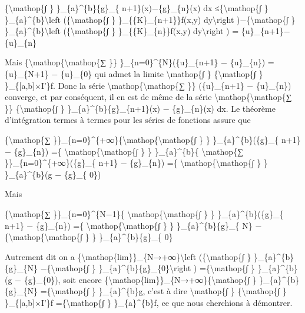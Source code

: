 \documentclass[]{article}
\begin{document}
\{\textbackslash{}mathop\{∫ \} \}\_\{a\}\^{}\{b\}\textbar{}\{g\}\_\{
n+1\}(x)−\{g\}\_\{n\}(x)\textbar{} dx ≤\{\textbackslash{}mathop\{∫ \}
\}\_\{a\}\^{}\{b\}\textbackslash{}left (\{\textbackslash{}mathop\{∫ \}
\}\_\{\{K\}\_\{n+1\}\}\textbar{}f(x,y)\textbar{} dy\textbackslash{}right
)−\{\textbackslash{}mathop\{∫ \} \}\_\{a\}\^{}\{b\}\textbackslash{}left
(\{\textbackslash{}mathop\{∫ \}
\}\_\{\{K\}\_\{n\}\}\textbar{}f(x,y)\textbar{} dy\textbackslash{}right )
= \{u\}\_\{n+1\}−\{u\}\_\{n\}

Mais \{\textbackslash{}mathop\{\textbackslash{}mathop\{∑ \}\}
\}\_\{n=0\}\^{}\{N\}(\{u\}\_\{n+1\} − \{u\}\_\{n\}) = \{u\}\_\{N+1\} −
\{u\}\_\{0\} qui admet la limite \textbackslash{}mathop\{∫ \}
\{\textbackslash{}mathop\{∫ \}
\}\_\{{[}a,b{]}×I'\}\textbar{}f\textbar{}. Donc la série
\textbackslash{}mathop\{\textbackslash{}mathop\{∑ \}\} (\{u\}\_\{n+1\} −
\{u\}\_\{n\}) converge, et par conséquent, il en est de même de la série
\textbackslash{}mathop\{\textbackslash{}mathop\{∑ \}\}
\{\textbackslash{}mathop\{∫ \}
\}\_\{a\}\^{}\{b\}\textbar{}\{g\}\_\{n+1\}(x) −
\{g\}\_\{n\}(x)\textbar{} dx. Le théorème d'intégration termes à termes
pour les séries de fonctions assure que

\{\textbackslash{}mathop\{∑
\}\}\_\{n=0\}\^{}\{+∞\}\{\textbackslash{}mathop\{\textbackslash{}mathop\{∫
\} \} \}\_\{a\}\^{}\{b\}(\{g\}\_\{ n+1\} − \{g\}\_\{n\}) =\{
\textbackslash{}mathop\{\textbackslash{}mathop\{∫ \} \}
\}\_\{a\}\^{}\{b\}\{ \textbackslash{}mathop\{∑
\}\}\_\{n=0\}\^{}\{+∞\}(\{g\}\_\{ n+1\} − \{g\}\_\{n\}) =\{
\textbackslash{}mathop\{\textbackslash{}mathop\{∫ \} \}
\}\_\{a\}\^{}\{b\}(g − \{g\}\_\{ 0\})

Mais

\{\textbackslash{}mathop\{∑ \}\}\_\{n=0\}\^{}\{N−1\}\{
\textbackslash{}mathop\{\textbackslash{}mathop\{∫ \} \}
\}\_\{a\}\^{}\{b\}(\{g\}\_\{ n+1\} − \{g\}\_\{n\}) =\{
\textbackslash{}mathop\{\textbackslash{}mathop\{∫ \} \}
\}\_\{a\}\^{}\{b\}\{g\}\_\{ N\}
−\{\textbackslash{}mathop\{\textbackslash{}mathop\{∫ \} \}
\}\_\{a\}\^{}\{b\}\{g\}\_\{ 0\}

Autrement dit on a
\{\textbackslash{}mathop\{lim\}\}\_\{N→+∞\}\textbackslash{}left
(\{\textbackslash{}mathop\{∫ \} \}\_\{a\}\^{}\{b\}\{g\}\_\{N\}
−\{\textbackslash{}mathop\{∫ \}
\}\_\{a\}\^{}\{b\}\{g\}\_\{0\}\textbackslash{}right )
=\{\textbackslash{}mathop\{∫ \} \}\_\{a\}\^{}\{b\}(g − \{g\}\_\{0\}),
soit encore
\{\textbackslash{}mathop\{lim\}\}\_\{N→+∞\}\{\textbackslash{}mathop\{∫
\} \}\_\{a\}\^{}\{b\}\{g\}\_\{N\} =\{\textbackslash{}mathop\{∫ \}
\}\_\{a\}\^{}\{b\}g, c'est à dire \textbackslash{}mathop\{∫ \}
\{\textbackslash{}mathop\{∫ \} \}\_\{{[}a,b{]}×I'\}f
=\{\textbackslash{}mathop\{∫ \} \}\_\{a\}\^{}\{b\}f, ce que nous
cherchions à démontrer.
\end{document}

